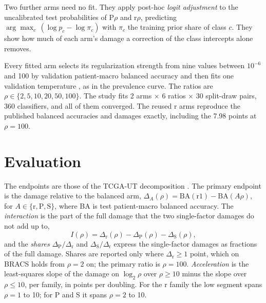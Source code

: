 \documentclass[11pt]{article}
\begin{document}
\noindent Two further arms need no fit. They apply post-hoc \emph{logit adjustment} \citep{menon2021longTail} to the uncalibrated test probabilities of P$\rho$ and r$\rho$, predicting $\arg\max_c\,(\log p_c - \log\pi_c)$ with $\pi_c$ the training prior share of class $c$. They show how much of each arm's damage a correction of the class intercepts alone removes.

Every fitted arm selects its regularization strength from nine values between $10^{-6}$ and 100 by validation patient-macro balanced accuracy \citep{queisler2026patientShortage} and then fits one validation temperature \citep{guo2017calibration}, as in the prevalence curve. The ratios are $\rho\in\{2,5,10,20,50,100\}$. The study fits 2 arms $\times$ 6 ratios $\times$ 30 split-draw pairs, 360 classifiers, and all of them converged. The reused r arms reproduce the published balanced accuracies and damages exactly, including the 7.98 points at $\rho=100$.

\section{Evaluation}
\label{sec:evaluation}
The endpoints are those of the TCGA-UT decomposition \citep{queisler2026causeTcga}. The primary endpoint is the damage relative to the balanced arm, $\Delta_A(\rho)=\mathrm{BA}(\text{r1})-\mathrm{BA}(A\rho)$, for $A\in\{\text{r},\text{P},\text{S}\}$, where BA is test patient-macro balanced accuracy. The \emph{interaction} is the part of the full damage that the two single-factor damages do not add up to,
\begin{equation}
  I(\rho) = \Delta_\text{r}(\rho) - \Delta_\text{P}(\rho) - \Delta_\text{S}(\rho),
  \label{eq:interaction}
\end{equation}
\noindent and the \emph{shares} $\Delta_\text{P}/\Delta_\text{r}$ and $\Delta_\text{S}/\Delta_\text{r}$ express the single-factor damages as fractions of the full damage. Shares are reported only where $\Delta_\text{r}\geq1$ point, which on BRACS holds from $\rho=2$ on; the primary ratio is $\rho=100$. \emph{Acceleration} is the least-squares slope of the damage on $\log_2\rho$ over $\rho\geq10$ minus the slope over $\rho\leq10$, per family, in points per doubling. For the r family the low segment spans $\rho=1$ to 10; for P and S it spans $\rho=2$ to 10.
\end{document}
